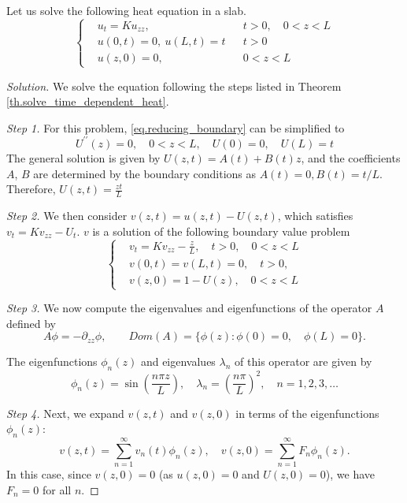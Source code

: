\begin{example}
    Let us solve the following heat equation in a slab.
    \begin{equation}
        \left\{
        \begin{aligned}
            &u_t=K u_{z z},\quad && t>0, \quad 0<z<L \\
            &u(0, t)=0,\ u(L, t)=t && t>0 \\
            &u(z, 0)=0,\quad && 0<z<L
        \end{aligned}
        \right.
    \end{equation}
\end{example}
\begin{proof}[Solution] We solve the equation following the steps listed in Theorem \ref{th.solve_time_dependent_heat}.

\textit{Step 1.} For this problem, \eqref{eq.reducing_boundary} can be simplified to 
$$
U^{\prime \prime}(z)=0, \quad 0<z<L, \quad U(0)=0, \quad U(L)=t
$$
The general solution is given by $U(z, t)=A(t)+B(t)z$, and the coefficients $A$, $B$ are determined by the boundary conditions as $A(t)=0, B(t)=t/L$. Therefore, $U(z, t)=\frac{zt}{L}$
    
\textit{Step 2.} We then consider $v(z, t)=u(z, t)-U(z, t)$, which satisfies $v_t = Kv_{zz} - U_t$. $v$ is a solution of the following boundary value problem
$$
\left\{\begin{aligned}
    & v_t=K v_{z z} - \frac{z}{L}, \quad t>0, \quad 0<z<L 
    \\
    & v(0, t)=v(L, t)=0, \quad t>0, 
    \\
    &v(z, 0)=1-U(z), \quad 0<z<L
    \end{aligned}\right.
$$

\textit{Step 3.} We now compute the eigenvalues and eigenfunctions of the operator $A$ defined by
\[
    A \phi = -\partial_{zz} \phi,\qquad \textit{Dom}(A) = \{\phi(z): \phi(0) = 0, \quad \phi(L) = 0\}.
\]

The eigenfunctions $\phi_n(z)$ and eigenvalues $\lambda_n$ of this operator are given by
\[
    \phi_n(z) = \sin\left( \frac{n \pi z}{L} \right), \quad \lambda_n = \left( \frac{n \pi}{L} \right)^2, \quad n = 1, 2, 3, \dots
\]

\textit{Step 4.} Next, we expand $v(z, t)$ and $v(z, 0)$ in terms of the eigenfunctions $\phi_n(z)$:
\[
    v(z, t) = \sum_{n=1}^\infty v_n(t) \phi_n(z), \quad v(z, 0) = \sum_{n=1}^\infty F_n \phi_n(z).
\]
In this case, since $v(z, 0) = 0$ (as $u(z, 0) = 0$ and $U(z, 0) = 0$), we have $F_n = 0$ for all $n$.


\end{proof}
